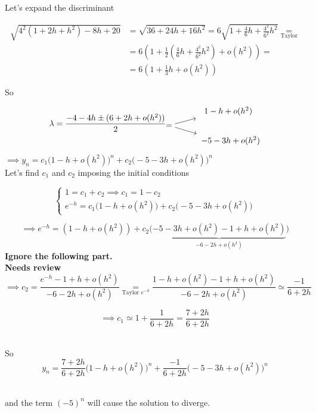 \begin{example}
    Let's expand the discriminant
    
    \begin{align*}
        \sqrt{4^2(1 + 2h + h^2) - 8h + 20} &= \sqrt{36 + 24h +16h^2} = 6\sqrt{1+\frac{4}{6}h + \frac{4^2}{6^2}h^2} \underset{\text{Taylor}}{=}\\
        &=6\left(1 + \frac{1}{2}\left(\frac{4}{6}h + \frac{4^2}{6^2}h^2\right) + o(h^2)\right) =\\
        &=6\left(1 + \frac{1}{3}h + o(h^2)\right)
    \end{align*}
      
    So
    
    $$
        \lambda = \frac{-4 - 4h \pm (6 + 2h + o(h^2))}{2}
          \begin{tikzcd}[cramped, sep=tiny]
                                    & \hspace{0.6cm}1-h+o(h^2) \\
            = \arrow[ur] \arrow[dr] &            \\
                                    & \hspace{0.8cm}-5-3h + o(h^2)
          \end{tikzcd}
    $$
    
    $\implies y_n = c_1\big(1-h+o(h^2)\big)^n + c_2\big(-5-3h+o(h^2)\big)^n$\\
    
    \newpage
    Let's find $c_1$ and $c_2$ imposing the initial conditions
    
    \[
    \begin{cases}
        1=c_1+c_2 \implies c_1 = 1-c_2 \\
        e^{-h} = c_1\big(1-h+o(h^2)\big) + c_2\big(-5-3h+o(h^2)\big)
    \end{cases}
    \]
    
    \[
       \implies e^{-h} = (1-h+o(h^2)) + c_2\big(\underbrace{-5-3h+o(h^2) - 1 + h + o(h^2)}_{-6-2h+o(h^2)}\big)
    \]
    \huge{\textbf{Ignore the following part. \\Needs review}}
    \normalsize
    \[
      \implies c_2 = \frac{e^{-h} - 1 + h +o(h^2)}{-6-2h+o(h^2)} \underset{\text{Taylor }e^{-h}}{=} \frac{1-h+o(h^2) - 1 + h +o(h^2)}{-6-2h+o(h^2)} \simeq \frac{-1}{6+2h}
    \]
    
    \[
      \implies c_1 \simeq 1 + \frac{1}{6+2h} = \frac{7+2h}{6+2h}
    \]
    
    \-\\So $$y_n = \frac{7+2h}{6+2h}\big(1-h+o(h^2)\big)^n + \frac{-1}{6+2h}\big(-5-3h+o(h^2)\big)^n$$
    
    \-\\and the term $(-5)^n$ will cause the solution to diverge.
\end{example}